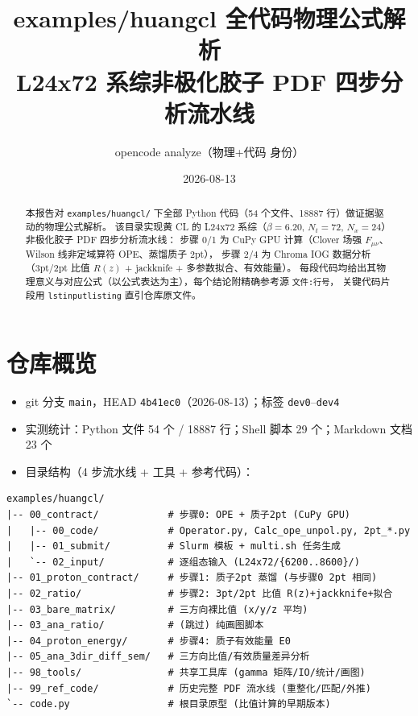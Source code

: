 \documentclass[UTF8,11pt]{ctexart}
\title{examples/huangcl 全代码物理公式解析\\\large L24x72 系综非极化胶子 PDF 四步分析流水线}
\author{opencode analyze（{物理+代码} 身份）}
\date{2026-08-13}
\begin{document}
\maketitle

\begin{abstract}
本报告对 \texttt{examples/huangcl/} 下全部 Python 代码（54 个文件、18887 行）做证据驱动的物理公式解析。
该目录实现黄 CL 的 L24x72 系综（$\beta=6.20$, $N_t=72$, $N_x=24$）非极化胶子 PDF 四步分析流水线：
步骤 0/1 为 CuPy GPU 计算（Clover 场强 $F_{\mu\nu}$、Wilson 线非定域算符 OPE、蒸馏质子 2pt），
步骤 2/4 为 Chroma IOG 数据分析（3pt/2pt 比值 $R(z)$ + jackknife + 多参数拟合、有效能量）。
每段代码均给出其物理意义与对应公式（以公式表达为主），每个结论附精确参考源 \texttt{文件:行号}，
关键代码片段用 \texttt{lstinputlisting} 直引仓库原文件。
\end{abstract}

\tableofcontents

\section{仓库概览}
\label{sec:overview}

\begin{itemize}
  \item git 分支 \texttt{main}，HEAD \texttt{4b41ec0}（2026-08-13）；标签 \texttt{dev0}--\texttt{dev4}
  \item 实测统计：Python 文件 54 个 / 18887 行；Shell 脚本 29 个；Markdown 文档 23 个
  \item 目录结构（4 步流水线 + 工具 + 参考代码）：
\end{itemize}

\begin{lstlisting}[language={},numbers=none]
examples/huangcl/
|-- 00_contract/            # 步骤0: OPE + 质子2pt (CuPy GPU)
|   |-- 00_code/            # Operator.py, Calc_ope_unpol.py, 2pt_*.py
|   |-- 01_submit/          # Slurm 模板 + multi.sh 任务生成
|   `-- 02_input/           # 逐组态输入 (L24x72/{6200..8600}/)
|-- 01_proton_contract/     # 步骤1: 质子2pt 蒸馏 (与步骤0 2pt 相同)
|-- 02_ratio/               # 步骤2: 3pt/2pt 比值 R(z)+jackknife+拟合
|-- 03_bare_matrix/         # 三方向裸比值 (x/y/z 平均)
|-- 03_ana_ratio/           # (跳过) 纯画图脚本
|-- 04_proton_energy/       # 步骤4: 质子有效能量 E0
|-- 05_ana_3dir_diff_sem/   # 三方向比值/有效质量差异分析
|-- 98_tools/               # 共享工具库 (gamma 矩阵/IO/统计/画图)
|-- 99_ref_code/            # 历史完整 PDF 流水线 (重整化/匹配/外推)
`-- code.py                 # 根目录原型 (比值计算的早期版本)
\end{lstlisting}
\end{document}
